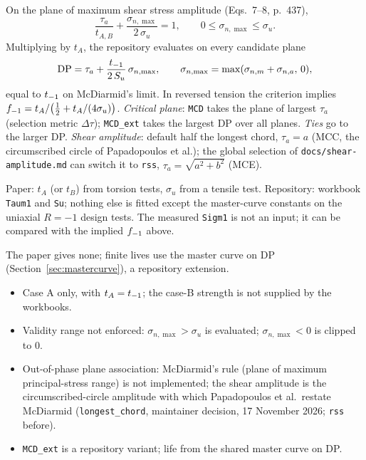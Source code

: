  On the plane of maximum shear stress amplitude (Eqs.~7--8, p.~437),
\begin{equation}
\frac{\tau_a}{t_{A,B}} + \frac{\sigma_{n,\max}}{2\,\sigma_u} = 1 ,\qquad 0\le\sigma_{n,\max}\le\sigma_u .
\label{eq:mcd-main}
\end{equation}
Multiplying by $t_A$, the repository evaluates on every candidate plane
\begin{equation}
\mathrm{DP} = \tau_a + \frac{t_{-1}}{2\,S_u}\,\sigma_{n,\max},\qquad
\sigma_{n,\max}=\max(\sigma_{n,m}+\sigma_{n,a},\,0),
\label{eq:mcd-dp}
\end{equation}
equal to $t_{-1}$ on McDiarmid's limit. In reversed tension the criterion implies
$f_{-1} = t_A/\bigl(\tfrac12 + t_A/(4\sigma_u)\bigr)$. \emph{Critical plane}: \texttt{MCD} takes the
plane of largest $\tau_a$ (selection metric $\Delta\tau$); \texttt{MCD\_ext} takes the largest DP over
all planes. \emph{Ties} go to the larger DP. \emph{Shear amplitude}: default half the
longest chord, $\tau_a=a$ (MCC, the circumscribed circle of Papadopoulos et al.); the global selection
of \texttt{docs/shear-amplitude.md} can switch it to \texttt{rss}, $\tau_a=\sqrt{a^2+b^2}$ (MCE).

 Paper: $t_A$ (or $t_B$) from torsion tests, $\sigma_u$ from a
tensile test. Repository: workbook \texttt{Taum1} and \texttt{Su}; nothing else is fitted except the
master-curve constants on the uniaxial $R=-1$ design tests. The measured \texttt{Sigm1} is not an
input; it can be compared with the implied $f_{-1}$ above.

 The paper gives none; finite lives use the master curve on DP
(Section~\ref{sec:mastercurve}), a repository extension.

\begin{itemize}
\item Case A only, with $t_A=t_{-1}$; the case-B strength is not supplied by the workbooks.
\item Validity range not enforced: $\sigma_{n,\max}>\sigma_u$ is evaluated; $\sigma_{n,\max}<0$ is
  clipped to 0.
\item Out-of-phase plane association: McDiarmid's rule (plane of maximum principal-stress range) is
  not implemented; the shear amplitude is the circumscribed-circle amplitude with which Papadopoulos
  et al.\ restate McDiarmid (\texttt{longest\_chord}, maintainer decision, 17 November 2026;
  \texttt{rss} before).
\item \texttt{MCD\_ext} is a repository variant; life from the shared master curve on DP.
\end{itemize}

